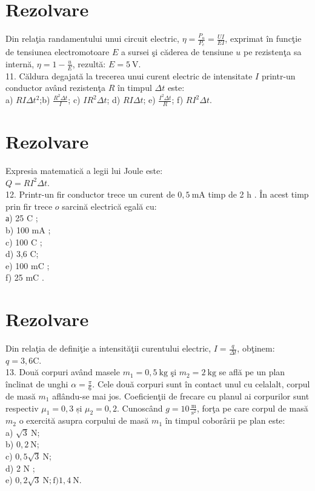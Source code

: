 \section*{Rezolvare}
Din relaţia randamentului unui circuit electric, $\eta=\frac{P_{u}}{P_{c}}=\frac{U I}{E I}$, exprimat în funcţie de tensiunea electromotoare $E$ a sursei şi căderea de tensiune $u$ pe rezistenţa sa internă, $\eta=1-\frac{u}{E}$, rezultă: $E=5 \mathrm{~V}$.\\
11. Căldura degajată la trecerea unui curent electric de intensitate $I$ printr-un conductor având rezistenţa $R$ în timpul $\Delta t$ este:\\
a) $R I \Delta t^{2}$;b) $\frac{R^{2} \Delta t}{I}$; c) $I R^{2} \Delta t$; d) $R I \Delta t$; e) $\frac{I^{2} \Delta t}{R}$; f) $R I^{2} \Delta t$.

\section*{Rezolvare}
Expresia matematică a legii lui Joule este:\\
$Q=R I^{2} \Delta t$.\\
12. Printr-un fir conductor trece un curent de $0,5 \mathrm{~mA}$ timp de 2 h . În acest timp prin fir trece $o$ sarcină electrică egală cu:\\
а) 25 C ;\\
b) 100 mA ;\\
c) 100 C ;\\
d) 3,6 C;\\
e) 100 mC ;\\
f) 25 mC .

\section*{Rezolvare}
Din relaţia de definiţie a intensităţii curentului electric, $I=\frac{q}{\Delta t}$, obţinem: $q=3,6 \mathrm{C}$.\\
13. Două corpuri având masele $m_{1}=0,5 \mathrm{~kg}$ şi $m_{2}=2 \mathrm{~kg}$ se află pe un plan înclinat de unghi $\alpha=\frac{\pi}{6}$. Cele două corpuri sunt în contact unul cu celalalt, corpul de masă $m_{1}$ aflându-se mai jos. Coeficienţii de frecare cu planul ai corpurilor sunt respectiv $\mu_{1}=0,3$ și $\mu_{2}=0,2$. Cunoscând $g=10 \frac{\mathrm{~m}}{\mathrm{~s}^{2}}$, forţa pe care corpul de masă $m_{2}$ o exercită asupra corpului de masă $m_{1}$ în timpul coborârii pe plan este:\\
a) $\sqrt{3} \mathrm{~N}$;\\
b) $0,2 \mathrm{~N}$;\\
c) $0,5 \sqrt{3} \mathrm{~N}$;\\
d) 2 N ;\\
e) $0,2 \sqrt{3} \mathrm{~N} ; \mathrm{f}) 1,4 \mathrm{~N}$.

